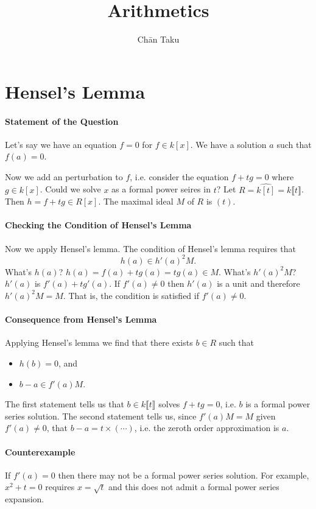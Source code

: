 \documentclass{article}
\title{Arithmetics}
\author{Ch\=an Taku}
\begin{document}
\maketitle

\section{Hensel's Lemma}

\paragraph*{Statement of the Question}
Let's say we have an equation $f=0$ for $f\in k[x]$.
We have a solution $a$ such that $f(a) = 0$.
\par
Now we add an perturbation to $f$, i.e. consider the equation $f + tg = 0$ where $g\in k[x]$.
Could we solve $x$ as a formal power seires in $t$?
Let $R = \widehat{k[t]} = k\llbracket t \rrbracket$.
Then $h = f+tg\in R[x]$.
The maximal ideal $M$ of $R$ is $(t)$.
\paragraph*{Checking the Condition of Hensel's Lemma}
Now we apply Hensel's lemma.
The condition of Hensel's lemma requires that
\[ h(a) \in h'(a)^2 M. \]
What's $h(a)$? $h(a) = f(a) + t g(a) = t g(a) \in M$.
What's $h'(a)^2 M$? $h'(a)$ is $f'(a) + t g'(a)$.
If $f'(a) \neq 0$ then $h'(a)$ is a unit and therefore $h'(a)^2 M = M$.
That is, the condition is satisfied if $\boxed{f'(a) \neq 0}$.
\paragraph*{Consequence from Hensel's Lemma}
Applying Hensel's lemma we find that there exists $b\in R$ such that
\begin{itemize}
    \item $h(b) = 0$, and
    \item $b - a \in f'(a) M$.
\end{itemize}
The first statement tells us that $b\in k\llbracket t \rrbracket$ solves $f+tg=0$, i.e. $b$ is a formal power series solution.
The second statement tells us, since $f'(a)M = M$ given $f'(a)\neq 0$, that $b-a = t\times (\cdots)$, i.e. the zeroth order approximation is $a$.
\paragraph*{Counterexample}
If $f'(a) = 0$ then there may not be a formal power series solution.
For example, $x^2 + t = 0$ requires $x = \sqrt{t}$ and this does not admit a formal power series expansion.

% 
% 
\end{document}
